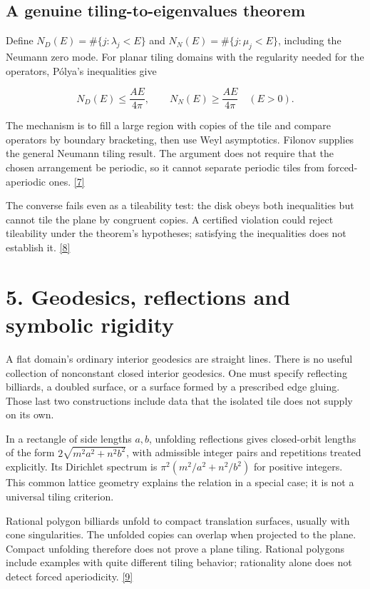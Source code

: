 \documentclass[11pt]{article}
\begin{document}
\subsection*{A genuine tiling-to-eigenvalues theorem}


Define \(N_D(E)=\#\{j:\lambda_j<E\}\) and \(N_N(E)=\#\{j:\mu_j<E\}\), including the Neumann zero mode. For planar tiling domains with the regularity needed for the operators, Pólya's inequalities give


\[ N_D(E)\le\frac{AE}{4\pi},\qquad N_N(E)\ge\frac{AE}{4\pi}\quad(E>0). \]

The mechanism is to fill a large region with copies of the tile and compare operators by boundary bracketing, then use Weyl asymptotics. Filonov supplies the general Neumann tiling result. The argument does not require that the chosen arrangement be periodic, so it cannot separate periodic tiles from forced-aperiodic ones. \hyperlink{ref7}{[7]}



The converse fails even as a tileability test: the disk obeys both inequalities but cannot tile the plane by congruent copies. A certified violation could reject tileability under the theorem's hypotheses; satisfying the inequalities does not establish it. \hyperlink{ref8}{[8]}




\section*{5. Geodesics, reflections and symbolic rigidity}


A flat domain's ordinary interior geodesics are straight lines. There is no useful collection of nonconstant closed interior geodesics. One must specify reflecting billiards, a doubled surface, or a surface formed by a prescribed edge gluing. Those last two constructions include data that the isolated tile does not supply on its own.



In a rectangle of side lengths \(a,b\), unfolding reflections gives closed-orbit lengths of the form \(2\sqrt{m^2a^2+n^2b^2}\), with admissible integer pairs and repetitions treated explicitly. Its Dirichlet spectrum is \(\pi^2(m^2/a^2+n^2/b^2)\) for positive integers. This common lattice geometry explains the relation in a special case; it is not a universal tiling criterion.



Rational polygon billiards unfold to compact translation surfaces, usually with cone singularities. The unfolded copies can overlap when projected to the plane. Compact unfolding therefore does not prove a plane tiling. Rational polygons include examples with quite different tiling behavior; rationality alone does not detect forced aperiodicity. \hyperlink{ref9}{[9]}
\end{document}
